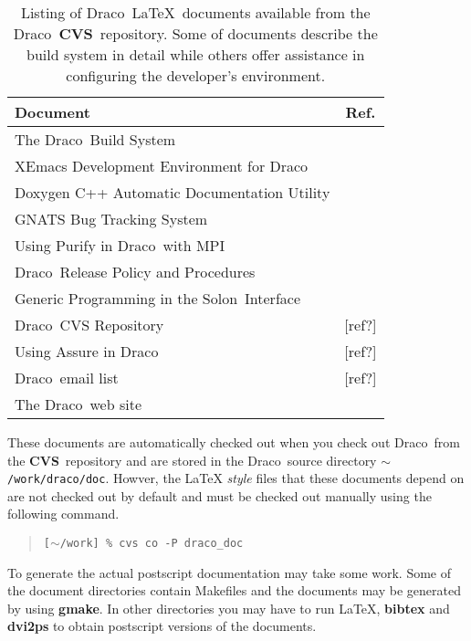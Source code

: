 \documentclass[11pt]{nmemo}
\newcommand{\comp}[1]{\normalfont\normalsize\texttt{#1}}
\newcommand{\draco}{{\normalfont\sffamily Draco}}
\newcommand{\solon}{{\normalfont\sffamily Solon}}
\newcommand{\cvs}{{\normalfont\bfseries CVS}}
\begin{document}
\begin{table}
  \caption{Listing of \draco\ \LaTeX\ documents available from the
    \draco\ \cvs\ repository.  Some of documents describe the build
    system in detail while others offer assistance in configuring the
    developer's environment.}
  \label{tab:draco_docs}
  \begin{center}
    \begin{tabular}{lc} \hline\hline
      \multicolumn{1}{l}{Document} & \multicolumn{1}{c}{Ref.} \\ \hline
      The \draco\ Build System               & ~\cite{draco-build} \\
      XEmacs Development Environment for \draco & ~\cite{xtm:9909} \\
      Doxygen C++ Automatic Documentation Utility & ~\cite{doxygen} \\
      GNATS Bug Tracking System              & ~\cite{draco-gnats} \\
      Using Purify in \draco\ with MPI       & ~\cite{draco-purify} \\
      \draco\ Release Policy and Procedures  & ~\cite{xtm:9936}    \\
      Generic Programming in the \solon\ Interface & ~\cite{ro98} \\
      \draco\ CVS Repository                 & [ref?] \\
      Using Assure in \draco                 & [ref?] \\
      \draco\ email list                     & [ref?] \\
      The \draco\ web site                   &  ~\cite{draco-web-site} \\
      \hline\hline
    \end{tabular}
  \end{center}
\end{table}

These documents are automatically checked out when you check out
\draco\ from the \cvs\ repository and are stored in the \draco\ source
directory \comp{$\sim$/work/draco/doc}.  Howver, the \LaTeX
\emph{style} files that these documents depend on are not checked out
by default and must be checked out manually using the following
command.

\begin{quote}
\texttt{[$\sim$/work] \% cvs co -P draco\_doc}
\end{quote}

To generate the actual postscript documentation may take some work.
Some of the document directories contain Makefiles and the documents
may be generated by using \textbf{gmake}.  In other directories you
may have to run \LaTeX, \textbf{bibtex} and \textbf{dvi2ps} to obtain
postscript versions of the documents.
\end{document}
